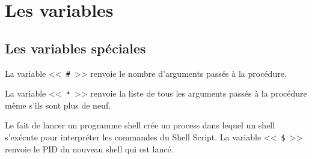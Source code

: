 %
%

\setcounter{remarque-cnt}{1}
\setcounter{example-cnt}{1}
\chapter{Les variables}
\thispagestyle{fancy}

\section{\label{variables-special-var}Les variables sp{\'e}ciales}

La variable <<~\verb=#=~>>  renvoie le
nombre d'arguments pass{\'e}s {\`a} la proc{\'e}dure.

La variable <<~\verb=*=~>> renvoie la liste
de tous les arguments pass{\'e}s {\`a} la proc{\'e}dure m{\^e}me s'ils
sont plus de neuf.

Le fait de lancer un programme shell cr{\'e}e un process dans lequel un
shell s'ex{\'e}cute pour interpr{\'e}ter les commandes du Shell Script.
La variable <<~\verb=$=~>> renvoie le PID
du nouveau shell qui est lanc{\'e}.

